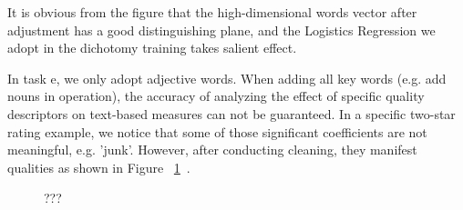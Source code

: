 \documentclass[12pt]{article}%
\begin{document}
It is obvious from the figure that the high-dimensional words vector after adjustment has a good distinguishing plane, and the Logistics Regression we adopt in the dichotomy training takes salient effect.

In task e, we only adopt adjective words. When adding all key words (e.g. add nouns in operation), the accuracy of analyzing the effect of specific quality descriptors on text-based measures can not be guaranteed. In a specific two-star rating example, we notice that some of those significant coefficients are not meaningful, e.g. 'junk'. However, after conducting cleaning, they manifest qualities as shown in Figure ~\ref{fissssg}~.


\begin{figure}[H]
	\centering
	\caption{???}
	\label{fissssg}
\end{figure}
\end{document}

